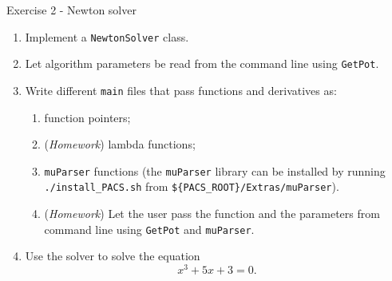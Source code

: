 \documentclass[10pt,aspectratio=169]{beamer}
\begin{document}
\begin{frame}{Exercise 2 - Newton solver}
\begin{enumerate}
\item Implement a \texttt{NewtonSolver} class.
\item Let algorithm parameters be read from the command line using \texttt{GetPot}.
\item Write different \texttt{main} files that pass functions and derivatives as:
\begin{enumerate}
\item function pointers;
\item (\textit{Homework}) lambda functions;
\item \texttt{muParser} functions (the \texttt{muParser} library can be installed by running \texttt{./install\_PACS.sh} from \texttt{\$\{PACS\_ROOT\}/Extras/muParser}).
\item (\textit{Homework}) Let the user pass the function and the parameters from command line using \texttt{GetPot} and \texttt{muParser}.
\end{enumerate}
\item Use the solver to solve the equation
\begin{equation*}
x^3 + 5 x + 3 = 0.
\end{equation*}
\end{enumerate}
\end{frame}
\end{document}
